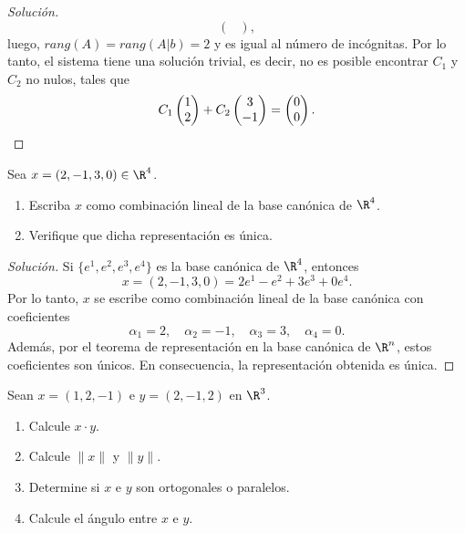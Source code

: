 \documentclass[a4,11pt]{aleph-notas}
\begin{document}
\begin{proof}[Solución]
\[\begin{pmatrix}
    \end{pmatrix},
    \]
    luego, $rang(A)= rang(A|b)= 2$ y es igual al número de incógnitas. Por lo tanto, el sistema tiene una solución trivial, es decir, no es posible encontrar $C_1$ y $C_2$ no nulos, tales que
    \[
C_1 \begin{pmatrix} 1 \\ 2 \end{pmatrix} + C_2 \begin{pmatrix} 3 \\ -1 \end{pmatrix} = \begin{pmatrix} 0 \\ 0 \end{pmatrix}.\qedhere
\]
\end{proof}

\begin{ejer}
    Sea $x=(2,-1,3,0)\in\R^4$.
    \begin{enumerate}
        \item Escriba $x$ como combinación lineal de la base canónica de $\R^4$.
        \item Verifique que dicha representación es única.
    \end{enumerate}
\end{ejer}

\begin{proof}[Solución]\hspace{0pt}
    Si $\{e^1,e^2,e^3,e^4\}$ es la base canónica de $\R^4$, entonces
    \[
        x=(2,-1,3,0)=2e^1-e^2+3e^3+0e^4.
    \]
    Por lo tanto, $x$ se escribe como combinación lineal de la base canónica con coeficientes
    \[
        \alpha_1=2,\quad \alpha_2=-1,\quad \alpha_3=3,\quad \alpha_4=0.
    \]
    Además, por el teorema de representación en la base canónica de $\R^n$, estos coeficientes son únicos. En consecuencia, la representación obtenida es única.
\end{proof}

\begin{ejer}
    Sean $x=(1,2,-1)$ e $y=(2,-1,2)$ en $\R^3$.
    \begin{enumerate}
        \item Calcule $x\cdot y$.
        \item Calcule $\|x\|$ y $\|y\|$.
        \item Determine si $x$ e $y$ son ortogonales o paralelos.
        \item Calcule el ángulo entre $x$ e $y$.
    \end{enumerate}
\end{ejer}
\end{document}
